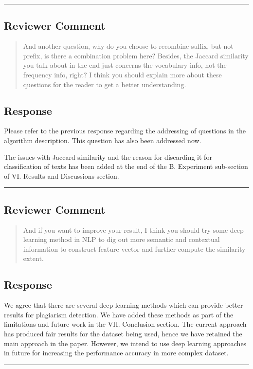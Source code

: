 \noindent\rule{17cm}{2.0pt}

\subsection{Reviewer Comment}
\begin{mdframed}
\begin{quote}
	And another question, why do you choose to recombine suffix, but not prefix,
	is there a combination problem here? Besides, the Jaccard similarity you talk
	about in the end just concerns the vocabulary info, not the frequency info,
	right? I think you should explain more about these questions for the reader to
	get a better understanding.
\end{quote}
\end{mdframed}

\subsection{Response}  
Please refer to the previous response regarding the addressing of questions in
the algorithm description. This question has also been addressed now. 

The issues with Jaccard similarity and the reason for discarding it for
classification of texts has been added at the end of the B. Experiment
sub-section of VI. Results and Discussions section. \\

\noindent\rule{17cm}{2.0pt}


\subsection{Reviewer Comment}
\begin{mdframed}
\begin{quote}
And if you want to improve your result, I think you should try some deep
learning method in NLP to dig out more semantic and contextual information to
construct feature vector and further compute the similarity extent.
\end{quote}
\end{mdframed}

\subsection{Response} 
We agree that there are several deep learning methods which can provide better
results for plagiarism detection. We have added these methods as part of the
limitations and future work in the VII. Conclusion section. The current approach
has produced fair results for the dataset being used, hence we have retained the
main approach in the paper. However, we intend to use deep learning approaches
in future for increasing the performance accuracy in more complex dataset.\\


\noindent\rule{17cm}{6.0pt}
